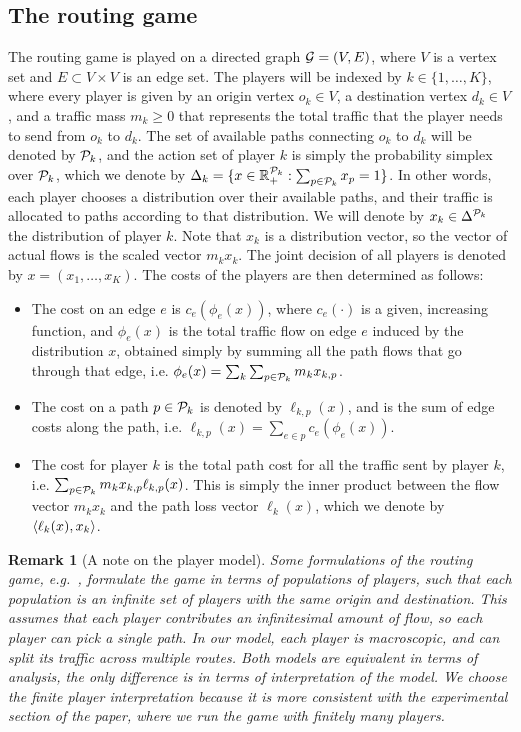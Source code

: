 \documentclass{sig-alternate-ipsn13}
\newtheorem{remark}{Remark}
\begin{document}
\subsection{The routing game}
\label{sec:routing_game}
The routing game is played on a directed graph $\mathcal{G} = (V, E)$, where $V$ is a vertex set and $E \subset V \times V$ is an edge set. The players will be indexed by $k \in \{1, \dots, K\}$, where every player is given by an origin vertex $o_k \in V$, a destination vertex $d_k \in V$, and a traffic mass $m_k \geq 0$ that represents the total traffic that the player needs to send from $o_k$ to $d_k$. The set of available paths connecting $o_k$ to $d_k$ will be denoted by $\mathcal{P}_k$, and the action set of player $k$ is simply the probability simplex over $\mathcal{P}_k$, which we denote by $\Delta_k = \{x \in \mathbb{R}_+^{\mathcal{P}_k} : \sum_{p \in \mathcal{P}_k} x_p = 1\}$. In other words, each player chooses a distribution over their available paths, and their traffic is allocated to paths according to that distribution. We will denote by $x_k\in \Delta^{\mathcal{P}_k}$ the distribution of player $k$. Note that $x_k$ is a distribution vector, so the vector of actual flows is the scaled vector $m_k x_k$. The joint decision of all players is denoted by $x = (x_1, \dots, x_K)$. The costs of the players are then determined as follows:
\begin{itemize}
\item The cost on an edge $e$ is $c_e(\phi_e(x))$, where $c_e(\cdot)$ is a given, increasing function, and $\phi_e(x)$ is the total traffic flow on edge $e$ induced by the distribution $x$, obtained simply by summing all the path flows that go through that edge, i.e. $\phi_e(x) = \sum_k \sum_{p \in \mathcal{P}_k} m_k x_{k, p}$.
\item The cost on a path $p \in \mathcal{P}_k$ is denoted by $\ell_{k, p}(x)$, and is the sum of edge costs along the path, i.e. $\ell_{k, p}(x) = \sum_{e \in p} c_e(\phi_e(x))$.
\item The cost for player $k$ is the total path cost for all the traffic sent by player $k$, i.e. $\sum_{p \in \mathcal{P}_k} m_k x_{k, p} \ell_{k, p}(x)$. This is simply the inner product between the flow vector $m_k x_k$ and the path loss vector $\ell_k(x)$, which we denote by $\left\langle \ell_k(x), x_k \right\rangle$.
\end{itemize}
\begin{remark}[A note on the player model] Some formulations of the routing game, e.g.~\cite{sandholm2001potential,krichene2015learning}, formulate the game in terms of populations of players, such that each population is an infinite set of players with the same origin and destination. This assumes that each player contributes an infinitesimal amount of flow, so each player can pick a single path. In our model, each player is macroscopic, and can split its traffic across multiple routes. Both models are equivalent in terms of analysis, the only difference is in terms of interpretation of the model. We choose the finite player interpretation because it is more consistent with the experimental section of the paper, where we run the game with finitely many players.
\end{remark}
\end{document}
